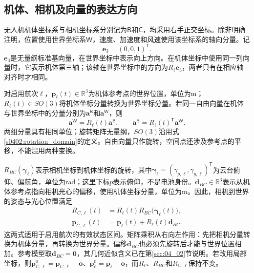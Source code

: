 \subsection{机体、相机及向量的表达方向}

无人机机体坐标系与相机坐标系分别记为$\mathsf B$和$\mathsf C$，均采用右手正交坐标。除非明确注明，位置使用世界坐标系$\mathsf W$，速度、加速度和风速使用该坐标系的轴向分量。记
\begin{equation}
 \mathbf e_3=(0,0,1)^{\mathsf T}.
 \label{s0403:vertical_axis}
\end{equation}
$\mathbf e_3$是无量纲标准基向量，在世界坐标中表示向上方向。在机体坐标中使用同一列向量时，它表示机体第三轴；该轴在世界坐标中的方向为$R_\ell\mathbf e_3$，两者只有在相应轴对齐时才相同。

对启用航次$\ell$，$\mathbf p_\ell(t)\in\mathbb R^3$为机体参考点的世界位置，单位为$\mathrm m$；$R_\ell(t)\in SO(3)$将机体坐标分量转换为世界坐标分量。若同一自由向量在机体与世界坐标中的分量分别为$\mathbf a^{\mathsf B}$和$\mathbf a^{\mathsf W}$，则
\begin{equation}
 \mathbf a^{\mathsf W}=R_\ell(t)\mathbf a^{\mathsf B},
 \qquad
 \mathbf a^{\mathsf B}=R_\ell(t)^{\mathsf T}\mathbf a^{\mathsf W}.
 \label{s0403:rotation_direction}
\end{equation}
两组分量具有相同单位；旋转矩阵无量纲，$SO(3)$沿用式\eqref{s0402:rotation_domain}的定义。自由向量只作旋转，空间点还涉及参考点的平移，不能混用两种变换。

$R_{BC}(\boldsymbol\gamma_\ell)$表示相机坐标到机体坐标的旋转，其中$\boldsymbol\gamma_\ell=(\gamma_{p,\ell},\gamma_{y,\ell})^{\mathsf T}$为云台俯仰、偏航角，单位为$\mathrm{rad}$；这里下标$p$表示俯仰，不是电池身份。$\mathbf d_{BC}\in\mathbb R^3$表示从机体参考点指向相机光心的偏移，使用机体坐标分量，单位为$\mathrm m$。因此，相机到世界的姿态与光心位置满足
\begin{align}
 R_{C,\ell}(t)
 &=R_\ell(t)R_{BC}\bigl(\boldsymbol\gamma_\ell(t)\bigr),
 \label{s0403:camera_rotation}\\
 \mathbf p_{C,\ell}(t)
 &=\mathbf p_\ell(t)+R_\ell(t)\mathbf d_{BC}.
 \label{s0403:camera_translation}
\end{align}
这两式适用于启用航次的有效状态区间。矩阵乘积从右向左作用：先把相机分量转换为机体分量，再转换为世界分量。偏移$\mathbf d_{BC}$也必须先旋转后才能与世界位置相加。参考模型取$\mathbf d_{BC}=\mathbf0$，其几何近似含义已在第\ref{sec:04_02}节说明。若改用局部坐标，则$\mathbf p_{C,\ell}^0=\mathbf p_{C,\ell}-\mathbf o$、$\mathbf p_\ell^0=\mathbf p_\ell-\mathbf o$，而$R_\ell$、$R_{BC}$和$R_{C,\ell}$保持不变。

